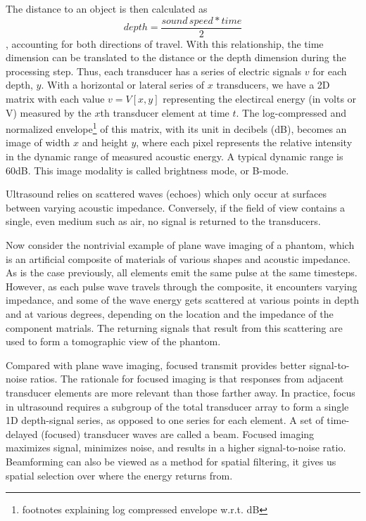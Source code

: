 The distance to an object is then calculated as
 $$depth = \frac{sound\,speed * time}{2}$$ %
 , accounting for both directions of travel. With this relationship, the time dimension can be translated to the distance or the depth dimension during the processing step. Thus, each transducer has a series of electric signals $v$ for each depth, $y$. With a horizontal or lateral series of $x$ transducers, we have a 2D matrix with each value $v = V[x, y]$ representing the electircal energy (in volts or V) measured by the $x$th transducer element at time $t$. The log-compressed and normalized envelope\footnote{footnotes explaining log compressed envelope w.r.t. dB} of this matrix, with its unit in decibels (dB), becomes an image of width $x$ and height $y$, where each pixel represents the relative intensity in the dynamic range of measured acoustic energy. A typical dynamic range is 60dB. This image modality is called brightness mode, or B-mode. %

 Ultrasound relies on scattered waves (echoes) which only occur at surfaces between varying acoustic impedance. Conversely, if the field of view contains a single, even medium such as air, no signal is returned to the transducers.

 Now consider the nontrivial example of plane wave imaging of a phantom, which is an artificial composite of materials of various shapes and acoustic impedance. As is the case previously, all elements emit the same pulse at the same timesteps. However, as each pulse wave travels through the composite, it encounters varying impedance, and some of the wave energy gets scattered at various points in depth and at various degrees, depending on the location and the impedance of the component matrials. The returning signals that result from this scattering are used to form a tomographic view of the phantom.

 Compared with plane wave imaging, focused transmit provides better signal-to-noise ratios. The rationale for focused imaging is that responses from adjacent transducer elements are more relevant than those farther away. In practice, focus in ultrasound requires a subgroup of the total transducer array to form a single 1D depth-signal series, as opposed to one series for each element. A set of time-delayed (focused) transducer waves are called a beam. Focused imaging maximizes signal, minimizes noise, and results in a higher signal-to-noise ratio. Beamforming can also be viewed as a method for spatial filtering, it gives us spatial selection over where the energy returns from.

